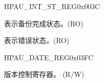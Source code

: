 \begin{register}{H}{PAU\_INT\_ST\_REG}{0x003C}\label{regdesc:PAUINTSTREG}
%
%
%
\regnewline%
\begin{regdesc}\begin{reglist}
\label{fielddesc:PAUDONEINTST}\item [PAU\_DONE\_INT\_ST] 表示备份完成状态。(RO)
\label{fielddesc:PAUERRORINTST}\item [PAU\_ERROR\_INT\_ST] 表示错误状态。(RO)
\end{reglist}\end{regdesc}
\end{register}


\begin{register}{H}{PAU\_DATE\_REG}{0x03FC}\label{regdesc:PAUDATEREG}
%
%
\regnewline%
\begin{regdesc}\begin{reglist}
\label{fielddesc:PAUDATE}\item [PAU\_DATE] 版本控制寄存器。 (R/W)
\end{reglist}\end{regdesc}
\end{register}
